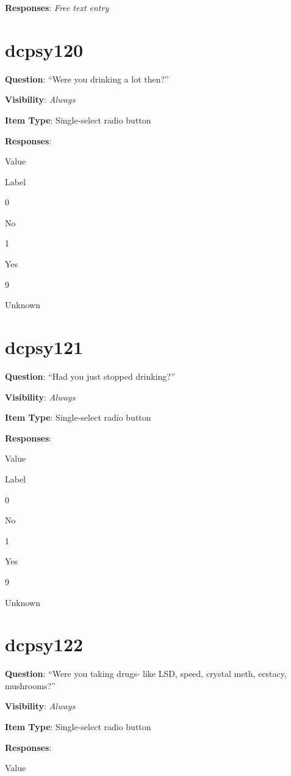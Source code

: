 \documentclass[]{book}
\begin{document}
\textbf{Responses}: \emph{Free text entry}

\hypertarget{dcpsy120}{%
\section{dcpsy120}\label{dcpsy120}}

\textbf{Question}: ``Were you drinking a lot then?''

\textbf{Visibility}: \emph{Always}

\textbf{Item Type}: Single-select radio button

\textbf{Responses}:

Value

Label

0

No

1

Yes

9

Unknown

\hypertarget{dcpsy121}{%
\section{dcpsy121}\label{dcpsy121}}

\textbf{Question}: ``Had you just stopped drinking?''

\textbf{Visibility}: \emph{Always}

\textbf{Item Type}: Single-select radio button

\textbf{Responses}:

Value

Label

0

No

1

Yes

9

Unknown

\hypertarget{dcpsy122}{%
\section{dcpsy122}\label{dcpsy122}}

\textbf{Question}: ``Were you taking drugs- like LSD, speed, crystal meth, ecstacy, mushrooms?''

\textbf{Visibility}: \emph{Always}

\textbf{Item Type}: Single-select radio button

\textbf{Responses}:

Value
\end{document}
